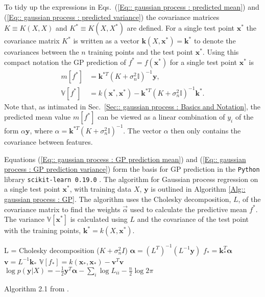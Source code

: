 \documentclass[twoside,english]{uiofysmaster}
\begin{document}
{{To tidy up the expressions in Eqs.~(\ref{Eq:: gaussian process : predicted mean}) and (\ref{Eq:: gaussian process : predicted variance}) the covariance matrices $K\equiv K(X, X)$ and $K^* \equiv K(X, X^*)$ are defined. For a single test point $\textbf{x}^*$ the covariance matrix $K^*$ is written as a vector $\textbf{k}(X, \textbf{x}^*) = \textbf{k}^*$ to denote the covariances between the $n$ training points and the test point $\textbf{x}^*$. Using this compact notation the GP prediction of $f^*=f(\textbf{x}^*)$ for a single test point $\textbf{x}^*$ is
\begin{align}
m[f^*] &= \textbf{k}^{*T}(K + \sigma_n^2\mathbb{I})^{-1} \textbf{y},\label{Eq:: gaussian process : GP prediction mean}\\
\mathbb{V}[f^*] &= k(\textbf{x}^*, \textbf{x}^*) - \textbf{k}^{*T}(K + \sigma_n^2 \mathbb{I})^{-1} \textbf{k}^*\label{Eq:: gaussian process : GP prediction variance}.
\end{align}
Note that, as intimated in Sec.~\ref{Sec:: gaussian process : Basics and Notation}, the predicted mean value $m[f^*]$ can be viewed as a linear combination of $y_i$ of the form $\alpha \textbf{y}$, where $\alpha = \textbf{k}^{*T}(K + \sigma_n^2\mathbb{I})^{-1}$. The vector $\alpha$ then only contains the covariance between features.

Equations (\ref{Eq:: gaussian process : GP prediction mean}) and (\ref{Eq:: gaussian process : GP prediction variance}) form the basis for GP prediction in the \verb|Python| library \verb|scikit-learn 0.19.0|  \cite{scikit-learn}. The algorithm for Gaussian process regression on a single test point $\textbf{x}^*$, with training data $X$, $\textbf{y}$ is outlined in Algorithm \ref{Alg:: gaussian process : GP}. The algorithm uses the Cholesky decomposition, $L$, of the covariance matrix to find the weights $\vec{\alpha}$ used to calculate the predictive mean $f^*$. The variance $\mathbb{V}[\textbf{x}^*]$ is calculated using $L$ and the covariance of the test point with the training points, $\textbf{k}^* = k(X, \textbf{x}^*)$.

\begin{algorithm}
L = Cholesky decomposition ($K + \sigma_n^2 I$) \;
$\boldsymbol{\alpha} = (L^T)^{-1}(L^{-1} \textbf{y})$ \;
$f_* = \textbf{k}_*^T \boldsymbol{\alpha}$ \;
$\textbf{v} = L^{-1} \textbf{k}_*$ \;
$\mathbb{V}[f_*] = k(\textbf{x}_*, \textbf{x}_*) - \textbf{v}^T \textbf{v}$ \;
$\log p(\textbf{y}|X) = - \frac{1}{2} \textbf{y}^T \boldsymbol{\alpha} - \sum_i \log L_{ii} - \frac{n}{2} \log 2 \pi$ \;
\caption{Algorithm 2.1 from \cite{rasmussen2006gaussian}.}
\label{Alg:: gaussian process : GP}
\end{algorithm}




}}
\end{document}
